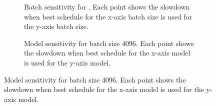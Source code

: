 \begin{figure}[]
  \centering
  \begin{subfigure}[b]{.3\textwidth}
    \caption{\label{fig:sensitivitya} Batch sensitivity for . Each point shows the slowdown when best schedule for the 
    x-axis batch size is used for the y-axis batch size.}
  \end{subfigure}
  \begin{subfigure}[b]{.3\textwidth}
    \caption{\label{fig:sensitivityb} Model sensitivity for batch size 4096. Each point shows the slowdown when best schedule for the
    x-axis model is used for the y-axis model.}
  \end{subfigure}
\end{figure}

